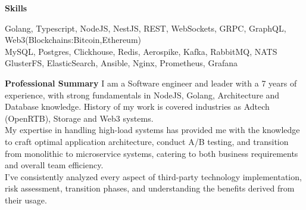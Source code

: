 \documentclass{resume} %
\begin{document}
\begin{rSection}{\textbf{Skills}}

       Golang, Typescript, NodeJS, NestJS, REST, WebSockets, GRPC, GraphQL, Web3(Blockchains:Bitcoin,Ethereum)
       \\ MySQL, Postgres, Clickhouse, Redis, Aerospike, Kafka, RabbitMQ, NATS
       \\ GlusterFS, ElasticSearch, Ansible, Nginx, Prometheus, Grafana
\end{rSection}

\begin{rSection}{\textbf{Professional Summary}}
{ I am a Software engineer and leader with a 7 years of experience, with strong fundamentals in NodeJS, Golang, Architecture and Database
knowledge. History of my work is covered industries as Adtech (OpenRTB), Storage and Web3 systems.
\\ My expertise in handling high-load systems has provided me with the knowledge to craft optimal application architecture, conduct A/B testing, and transition from monolithic to microservice systems, catering to both business requirements and overall team efficiency.
\\ I've consistently analyzed every aspect of third-party technology implementation, risk assessment, transition phases, and understanding the benefits derived from their usage.
}

\end{rSection}

\end{document}
